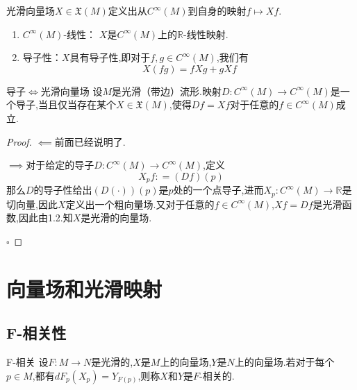 \documentclass[../../几何与拓扑.tex]{subfiles}
\begin{document}
\begin{proposition}
    光滑向量场$X \in \mathfrak{X}\left( M \right)$定义出从$C^{\infty}\left( M \right)$到自身的映射$f\mapsto Xf$.
\end{proposition}

\begin{remark}
    \begin{enumerate}
        \item \(  C^{\infty}\left( M \right)   \)-线性： $X$是$C^{\infty}\left( M \right)$上的$\mathbb{R}$-线性映射.
        \item 导子性：$X$具有导子性,即对于$f,g \in C^{\infty}\left( M \right)$,我们有 $$ X\left( fg \right) = fXg+gXf $$
    \end{enumerate}
    
\end{remark}

\begin{proposition}{导子$\iff$光滑向量场}\label{向量场就是导子}
    设$M$是光滑（带边）流形.映射$D:C^{\infty}\left( M \right)\to C^{\infty}\left( M \right)$是一个导子,当且仅当存在某个$X \in \mathfrak{X}\left( M \right)$,使得$Df=Xf$对于任意的$f \in C^{\infty}\left( M \right)$成立.

\end{proposition}

\begin{proof}
    $\impliedby$前面已经说明了.

$\implies$对于给定的导子$D:C^{\infty}\left( M \right)\to C^{\infty}\left( M \right)$,定义 $$ X_{p}f: = \left( Df \right) \left( p \right)  $$那么$D$的导子性给出$\left( D \left( \cdot \right) \right)\left( p \right)$是$p$处的一个点导子,进而$X_{p}: C^{\infty}\left( M \right)\to \mathbb{R}$是切向量,因此$X$定义出一个粗向量场.又对于任意的$f\in C^{\infty}\left( M \right)$,$Xf=Df$是光滑函数,因此由1.2.知$X$是光滑的向量场.

    \hfill $\square$
\end{proof}

\section{向量场和光滑映射}

\subsection{F-相关性}

\begin{definition}{F-相关}
    设$F:M\to N$是光滑的,$X$是$M$上的向量场,$Y$是$N$上的向量场.若对于每个$p \in M$,都有$dF_{p}\left( X_{p} \right)=Y_{F\left( p \right)}$,则称$X$和$Y$是$F$-相关的.
\end{definition}
\end{document}
